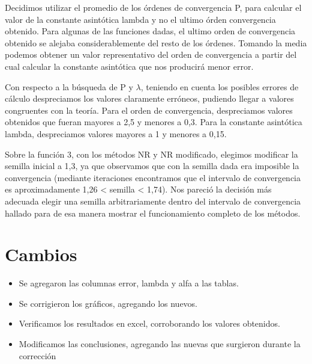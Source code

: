 \documentclass[titlepage,a4paper]{article}
\begin{document}
Decidimos utilizar el promedio de los órdenes de convergencia P, para calcular el valor de la constante asintótica lambda y no el ultimo órden convergencia obtenido. Para algunas de las funciones dadas, el ultimo orden de convergencia obtenido se alejaba considerablemente del resto de los órdenes. Tomando la media podemos obtener un valor representativo del orden de convergencia a partir del cual calcular la constante asintótica que nos producirá menor error.
 
Con respecto a la búsqueda de P y $\lambda$, teniendo en cuenta los posibles errores de cálculo despreciamos los valores claramente erróneos, pudiendo llegar a valores congruentes con la teoría. Para el orden de convergencia, despreciamos valores obtenidos que fueran mayores a 2,5 y menores a 0,3. Para la constante asintótica lambda, despreciamos valores mayores a 1 y menores a 0,15. 

Sobre la función 3, con los métodos NR y NR modificado, elegimos modificar la semilla inicial a 1,3, ya que observamos que con la semilla dada era imposible la convergencia (mediante iteraciones encontramos que el intervalo de convergencia es aproximadamente 1,26 < semilla < 1,74). Nos pareció la decisión más adecuada elegir una semilla arbitrariamente dentro del intervalo de convergencia hallado para de esa manera mostrar el funcionamiento completo de los métodos.

\section{Cambios}\label{sec:cambios}
    \begin{itemize}
	\item Se agregaron las columnas error, lambda y alfa a las tablas.
        \item Se corrigieron los gráficos, agregando los nuevos.
        \item Verificamos los resultados en excel, corroborando los valores obtenidos.
        \item Modificamos las conclusiones, agregando las nuevas que surgieron durante la corrección
    \end{itemize}
\end{document}
